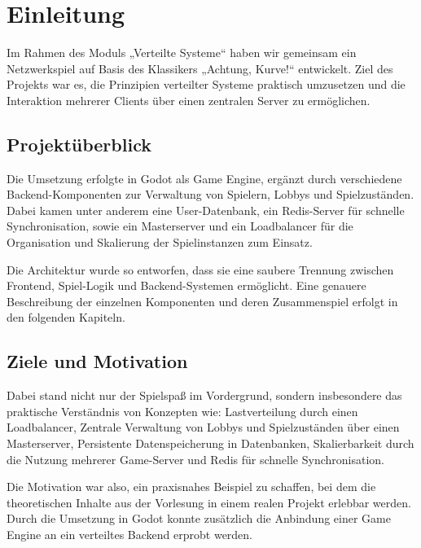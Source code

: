 \chapter{Einleitung}
\label{cha:einleitung}

Im Rahmen des Moduls „Verteilte Systeme“ haben wir gemeinsam ein Netzwerkspiel auf Basis des Klassikers „Achtung, Kurve!“ entwickelt. Ziel des Projekts war es, die Prinzipien verteilter Systeme praktisch umzusetzen und die Interaktion mehrerer Clients über einen zentralen Server zu ermöglichen.

\section{Projektüberblick}

Die Umsetzung erfolgte in Godot als Game Engine, ergänzt durch verschiedene Backend-Komponenten zur Verwaltung von Spielern, Lobbys und Spielzuständen. Dabei kamen unter anderem eine User-Datenbank, ein Redis-Server für schnelle Synchronisation, sowie ein Masterserver und ein Loadbalancer für die Organisation und Skalierung der Spielinstanzen zum Einsatz.

Die Architektur wurde so entworfen, dass sie eine saubere Trennung zwischen Frontend, Spiel-Logik und Backend-Systemen ermöglicht. Eine genauere Beschreibung der einzelnen Komponenten und deren Zusammenspiel erfolgt in den folgenden Kapiteln.

\section{Ziele und Motivation}

Dabei stand nicht nur der Spielspaß im Vordergrund, sondern insbesondere das praktische Verständnis von Konzepten wie:
Lastverteilung durch einen Loadbalancer, Zentrale Verwaltung von Lobbys und Spielzuständen über einen Masterserver, Persistente Datenspeicherung in Datenbanken, Skalierbarkeit durch die Nutzung mehrerer Game-Server und Redis für schnelle Synchronisation.

Die Motivation war also, ein praxisnahes Beispiel zu schaffen, bei dem die theoretischen Inhalte aus der Vorlesung in einem realen Projekt erlebbar werden. Durch die Umsetzung in Godot konnte zusätzlich die Anbindung einer Game Engine an ein verteiltes Backend erprobt werden.